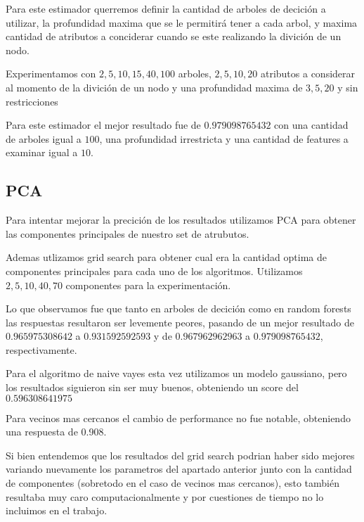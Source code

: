 Para este estimador querremos definir la cantidad de arboles de decición a utilizar, la profundidad maxima que se le permitirá tener a cada arbol, y maxima cantidad de atributos a conciderar cuando se este realizando la divición de un nodo.

Experimentamos con $2,5,10,15,40,100$ arboles, $2,5,10,20$ atributos a considerar al momento de la divición de un nodo y una profundidad maxima de $3,5,20$ y sin restricciones


Para este estimador el mejor resultado fue de $0.979098765432$ con una cantidad de arboles igual a $100$, una profundidad irrestricta y una cantidad de features a examinar igual a $10$.


\subsection{PCA}

Para intentar mejorar la precición de los resultados utilizamos PCA para obtener las componentes principales de nuestro set de atrubutos. 

Ademas utlizamos grid search para obtener cual era la cantidad optima de componentes principales para cada uno de los algoritmos. Utilizamos $2,5,10,40,70$ componentes para la experimentación.

Lo que observamos fue que tanto en arboles de decición como en random forests las respuestas resultaron ser levemente peores, pasando de un mejor resultado de $0.965975308642$ a $0.931592592593$ y de $0.967962962963$ a $0.979098765432$, respectivamente.

Para el algoritmo de naive vayes esta vez utilizamos un modelo gaussiano, pero los resultados siguieron sin ser muy buenos, obteniendo un score del $0.596308641975$

Para vecinos mas cercanos el cambio de performance no fue notable, obteniendo una respuesta de 0.908.

Si bien entendemos que los resultados del grid search podrian haber sido mejores variando nuevamente los parametros del apartado anterior junto con la cantidad de componentes (sobretodo en el caso de vecinos mas cercanos), esto también resultaba muy caro computacionalmente y por cuestiones de tiempo no lo incluimos en el trabajo.

